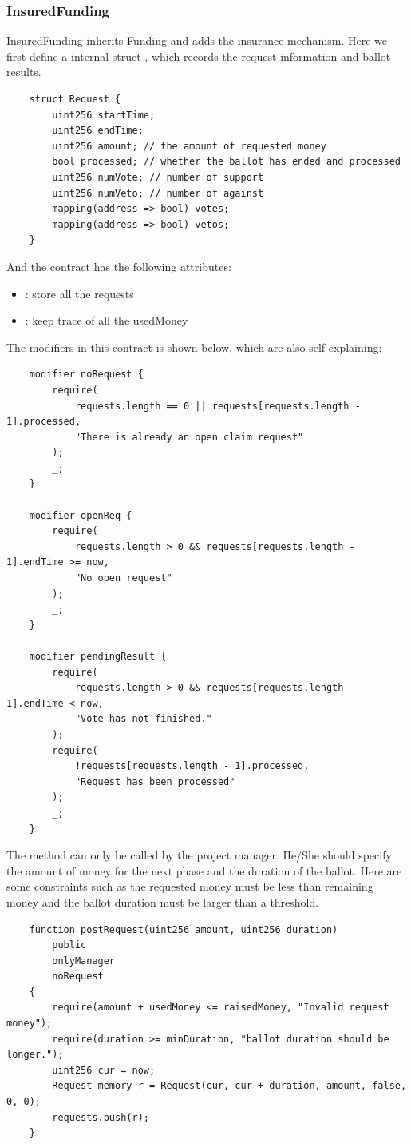 \documentclass{article}
\begin{document}
\subsubsection{InsuredFunding}
InsuredFunding inherits Funding and adds the insurance mechanism. Here we first define a internal struct , which records the request information and ballot results.

\begin{lstlisting}
    struct Request {
        uint256 startTime;
        uint256 endTime;
        uint256 amount; // the amount of requested money
        bool processed; // whether the ballot has ended and processed
        uint256 numVote; // number of support
        uint256 numVeto; // number of against
        mapping(address => bool) votes;
        mapping(address => bool) vetos;
    }
\end{lstlisting}

And the  contract has the following attributes:
\begin{itemize}
    \item {}: store all the requests
    \item {}: keep trace of all the usedMoney
\end{itemize}

The modifiers in this contract is shown below, which are also self-explaining:
\begin{lstlisting}
    modifier noRequest {
        require(
            requests.length == 0 || requests[requests.length - 1].processed,
            "There is already an open claim request"
        );
        _;
    }

    modifier openReq {
        require(
            requests.length > 0 && requests[requests.length - 1].endTime >= now,
            "No open request"
        );
        _;
    }

    modifier pendingResult {
        require(
            requests.length > 0 && requests[requests.length - 1].endTime < now,
            "Vote has not finished."
        );
        require(
            !requests[requests.length - 1].processed,
            "Request has been processed"
        );
        _;
    }
\end{lstlisting}

The method  can only be called by the project manager. He/She should specify the amount of money for the next phase and the duration of the ballot. Here are some constraints such as the requested money must be less than remaining money and the ballot duration must be larger than a threshold.
\begin{lstlisting}
    function postRequest(uint256 amount, uint256 duration)
        public
        onlyManager
        noRequest
    {
        require(amount + usedMoney <= raisedMoney, "Invalid request money");
        require(duration >= minDuration, "ballot duration should be longer.");
        uint256 cur = now;
        Request memory r = Request(cur, cur + duration, amount, false, 0, 0);
        requests.push(r);
    }
\end{lstlisting}
\end{document}

